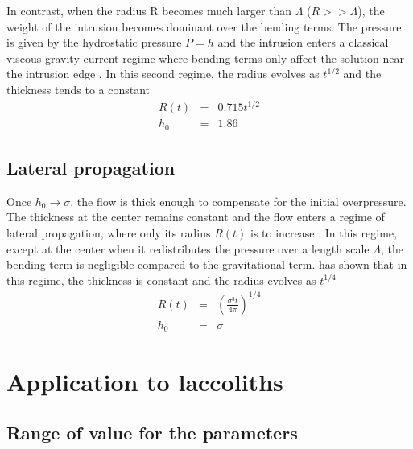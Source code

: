 In  contrast, when  the radius  R becomes  much larger  than $\Lambda$
($R>>\Lambda$), the weight of the  intrusion becomes dominant over the
bending  terms.  The  pressure is  given by  the hydrostatic  pressure
$P = h$  and the intrusion enters a classical  viscous gravity current
regime where bending terms only affect the solution near the intrusion
edge   \citep{Huppert:1982a,Michaut:2011kg,Lister:2013ia}.   In   this
second regime, the radius evolves as $t^{1/2}$ and the thickness tends
to a constant
\begin{eqnarray}
  R(t) &=& 0.715 t^{1/2}\label{Scaling-R-Gravi}\\
  h_0 &=& 1.86\label{Scaling-H-Gravi}
\end{eqnarray} 

\subsection{Lateral propagation}
\label{sec:lateral-propagation}

Once $h_0\rightarrow \sigma$,  the flow is thick  enough to compensate
for  the initial  overpressure. The  thickness at  the center  remains
constant and  the flow enters  a regime of lateral  propagation, where
only its radius $R(t)$ is  to increase \citep{Michaut:2011kg}. In this
regime, except at the center when it redistributes the pressure over a
length scale $\Lambda$, the bending term is negligible compared to the
gravitational  term. \citet{Michaut:2011kg}  has  shown  that in  this
regime, the thickness is constant and the radius evolves as $t^{1/4}$
\begin{eqnarray}
  R(t) &=& \left(\frac{\sigma^3 t}{4\pi}\right)^{1/4}\label{Scaling-R-Propa}\\
  h_0 &=& \sigma\label{Scaling-H-Propa}
\end{eqnarray} 

\section{Application to laccoliths}
\label{C2-sec:appl-earth-moon}

\subsection{Range of value for the parameters}
\label{sec:range-value-param}

